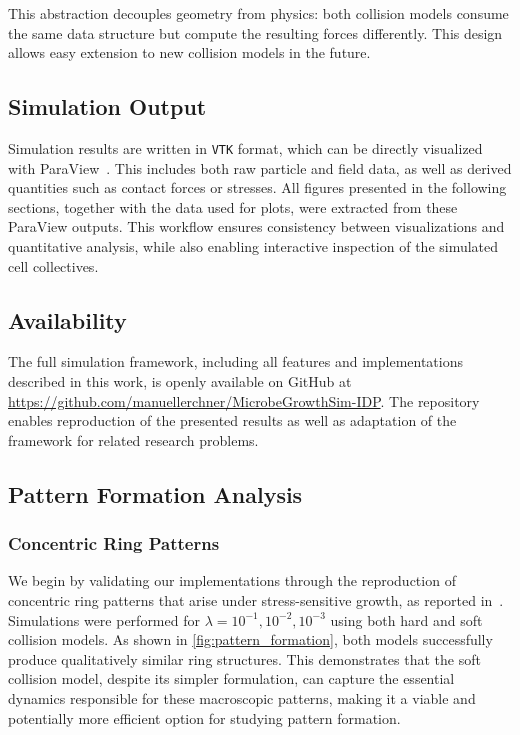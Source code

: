 \documentclass[conference]{IEEEtran}
\begin{document}
This abstraction decouples geometry from physics: both collision models consume the same data structure but compute the resulting forces differently. This design allows easy extension to new collision models in the future.

\subsection{Simulation Output}

Simulation results are written in \texttt{VTK} format, which can be directly visualized with ParaView~\cite{ahrens2005paraview}. This includes both raw particle and field data, as well as derived quantities such as contact forces or stresses.
All figures presented in the following sections, together with the data used for plots, were extracted from these ParaView outputs. This workflow ensures consistency between visualizations and quantitative analysis, while also enabling interactive inspection of the simulated cell collectives.


\subsection{Availability}

The full simulation framework, including all features and implementations described in this work, is openly available on GitHub at \url{https://github.com/manuellerchner/MicrobeGrowthSim-IDP}.
The repository enables reproduction of the presented results as well as adaptation of the framework for related research problems.

\subsection{Pattern Formation Analysis}

\subsubsection{Concentric Ring Patterns}

We begin by validating our implementations through the reproduction of concentric ring patterns that arise under stress-sensitive growth, as reported in~\cite{Weady2024}. Simulations were performed for $\lambda = 10^{-1}, 10^{-2}, 10^{-3}$ using both hard and soft collision models. As shown in \autoref{fig:pattern_formation}, both models successfully produce qualitatively similar ring structures. This demonstrates that the soft collision model, despite its simpler formulation, can capture the essential dynamics responsible for these macroscopic patterns, making it a viable and potentially more efficient option for studying pattern formation.
\end{document}
